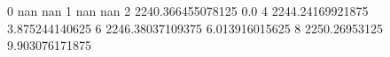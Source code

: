 0 nan nan
1 nan nan
2 2240.366455078125 0.0
4 2244.24169921875 3.875244140625
6 2246.38037109375 6.013916015625
8 2250.26953125 9.903076171875
